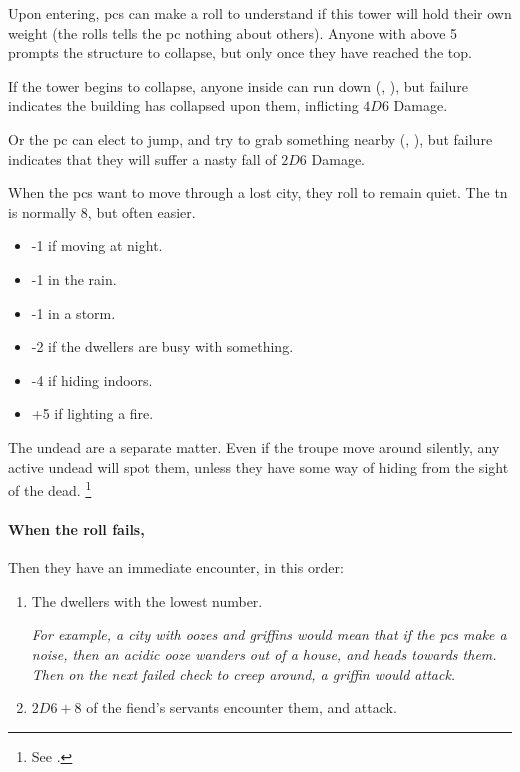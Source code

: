 \begin{multicols}{2}
\begin{dlist}
  Upon entering, \glspl{pc} can make a  roll to understand if this tower will hold their own weight (the rolls tells the \gls{pc} nothing about others).
  Anyone with  above 5 prompts the structure to collapse, but only once they have reached the top.

  If the tower begins to collapse, anyone inside can run down (, \tn[9]), but failure indicates the building has collapsed upon them, inflicting $4D6$ Damage.

  Or the \gls{pc} can elect to jump, and try to grab something nearby (, \tn[12]), but failure indicates that they will suffer a nasty fall of $2D6$ Damage.
\end{dlist}

\bigLine

\label{lostWhispers}

When the \glspl{pc} want to move through a lost city, they roll  to remain quiet.
The \gls{tn} is normally 8, but often easier.

\begin{itemize}
  \item
  -1 if moving at night.
  \item
  -1 in the rain.
  \item
  -1 in a storm.
  \item
  -2 if the dwellers are busy with something.
  \item
  -4 if hiding indoors.
  \item
  +5 if lighting a fire.
\end{itemize}

The undead are a separate matter.
Even if the troupe move around silently, any active undead will spot them, unless they have some way of hiding from the sight of the dead.%
\footnote{See .}

\paragraph{When the roll fails,}
\label{lostChase}

Then they have an immediate encounter, in this order:

\null
\begin{enumerate}
  \item
  The dwellers with the lowest number.

  \textit{For example, a city with oozes and griffins would mean that if the \glspl{pc} make a noise, then an acidic ooze wanders out of a house, and heads towards them.
  Then on the next failed check to creep around, a griffin would attack.}
  \item
  $2D6 + 8$ of the fiend's servants encounter them, and attack.


\end{enumerate}
\end{multicols}
